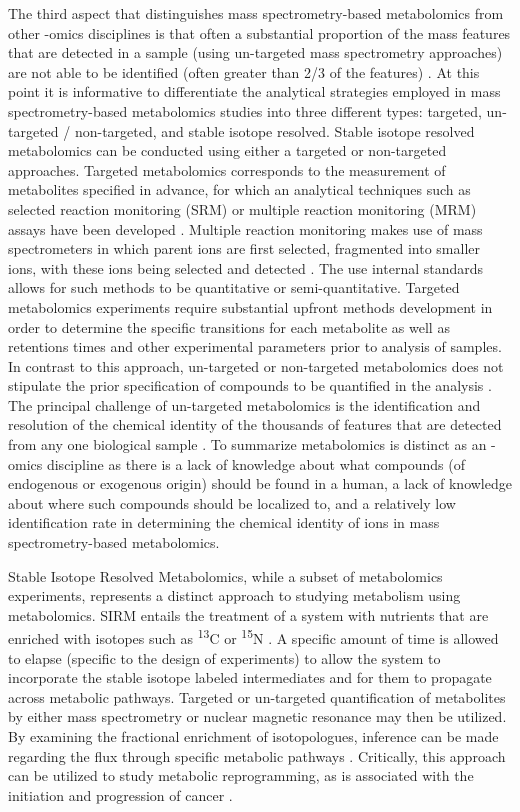 \begin{DoubleSpace*}
The third aspect that distinguishes mass spectrometry-based metabolomics from other -omics disciplines is that often a substantial proportion of the mass features that are detected in a sample (using un-targeted mass spectrometry approaches) are not able to be identified (often greater than 2/3 of the features) \cite{newgard2017}. At this point it is informative to differentiate the analytical strategies employed in mass spectrometry-based metabolomics studies into three different types: targeted, un-targeted / non-targeted, and stable isotope resolved. Stable isotope resolved metabolomics can be conducted using either a targeted or non-targeted approaches. Targeted metabolomics corresponds to the measurement of metabolites specified in advance, for which an analytical techniques such as selected reaction monitoring (SRM) or multiple reaction monitoring (MRM) assays have been developed \cite{roberts2012,zamboni2015}.  Multiple reaction monitoring makes use of mass spectrometers in which parent ions are first selected, fragmented into smaller ions, with these ions being selected and detected \cite{roberts2012}. The use internal standards allows for such methods to be quantitative or semi-quantitative. Targeted metabolomics experiments require substantial upfront methods development in order to determine the specific transitions for each metabolite as well as retentions times and other experimental parameters prior to analysis of samples. In contrast to this approach, un-targeted or non-targeted metabolomics does not stipulate the prior specification of compounds to be quantified in the analysis \cite{zamboni2015,putri2013,roberts2012}. The principal challenge of un-targeted metabolomics is the identification and resolution of the chemical identity of the thousands of features that are detected from any one biological sample \cite{zamboni2015}. To summarize metabolomics is distinct as an -omics discipline as there is a lack of knowledge about what compounds (of endogenous or exogenous origin) should be found in a human, a lack of knowledge about where such compounds should be localized to, and a relatively low identification rate in determining the chemical identity of ions in mass spectrometry-based metabolomics.

Stable Isotope Resolved Metabolomics, while a subset of metabolomics experiments, represents a distinct approach to studying metabolism using metabolomics. SIRM entails the treatment of a system with nutrients that are enriched with isotopes such as \textsuperscript{13}C or \textsuperscript{15}N  \cite{bruntz2017, newgard2017,higashi2014,fan2012}. A specific amount of time is allowed to elapse (specific to the design of experiments) to allow the system to incorporate the stable isotope labeled intermediates and for them to propagate across metabolic pathways. Targeted or un-targeted quantification of metabolites by either mass spectrometry or nuclear magnetic resonance may then be utilized. By examining the fractional enrichment of isotopologues, inference can be made regarding the flux through specific metabolic pathways \cite{higashi2014,fan2012}. Critically, this approach can be utilized to study metabolic reprogramming, as is associated with the initiation and progression of cancer \cite{bruntz2017}.


\end{DoubleSpace*}
